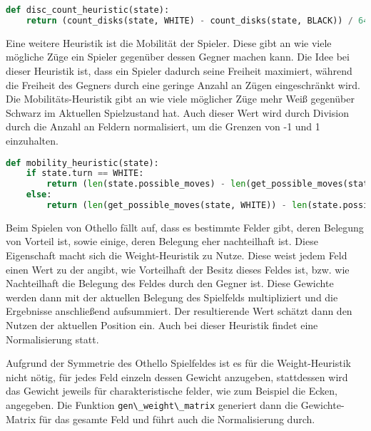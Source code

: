 \begin{lstlisting}[language=Python]
def disc_count_heuristic(state):
    return (count_disks(state, WHITE) - count_disks(state, BLACK)) / 64
\end{lstlisting}

Eine weitere Heuristik ist die Mobilität der Spieler. Diese gibt an wie
viele mögliche Züge ein Spieler gegenüber dessen Gegner machen kann. Die
Idee bei dieser Heuristik ist, dass ein Spieler dadurch seine Freiheit
maximiert, während die Freiheit des Gegners durch eine geringe Anzahl an
Zügen eingeschränkt wird. Die Mobilitäts-Heuristik gibt an wie viele
möglicher Züge mehr Weiß gegenüber Schwarz im Aktuellen Spielzustand
hat. Auch dieser Wert wird durch Division durch die Anzahl an Feldern
normalisiert, um die Grenzen von -1 und 1 einzuhalten.

\begin{lstlisting}[language=Python]
def mobility_heuristic(state):
    if state.turn == WHITE:
        return (len(state.possible_moves) - len(get_possible_moves(state, BLACK))) / 64
    else:
        return (len(get_possible_moves(state, WHITE)) - len(state.possible_moves)) / 64
\end{lstlisting}

Beim Spielen von Othello fällt auf, dass es bestimmte Felder gibt, deren
Belegung von Vorteil ist, sowie einige, deren Belegung eher nachteilhaft
ist. Diese Eigenschaft macht sich die Weight-Heuristik zu Nutze. Diese
weist jedem Feld einen Wert zu der angibt, wie Vorteilhaft der Besitz
dieses Feldes ist, bzw. wie Nachteilhaft die Belegung des Feldes durch
den Gegner ist. Diese Gewichte werden dann mit der aktuellen Belegung
des Spielfelds multipliziert und die Ergebnisse anschließend
aufsummiert. Der resultierende Wert schätzt dann den Nutzen der
aktuellen Position ein. Auch bei dieser Heuristik findet eine
Normalisierung statt.

Aufgrund der Symmetrie des Othello Spielfeldes ist es für die
Weight-Heuristik nicht nötig, für jedes Feld einzeln dessen Gewicht
anzugeben, stattdessen wird das Gewicht jeweils für charakteristische
felder, wie zum Beispiel die Ecken, angegeben. Die Funktion
\passthrough{\lstinline!gen\_weight\_matrix!} generiert dann die
Gewichte-Matrix für das gesamte Feld und führt auch die Normalisierung
durch.

